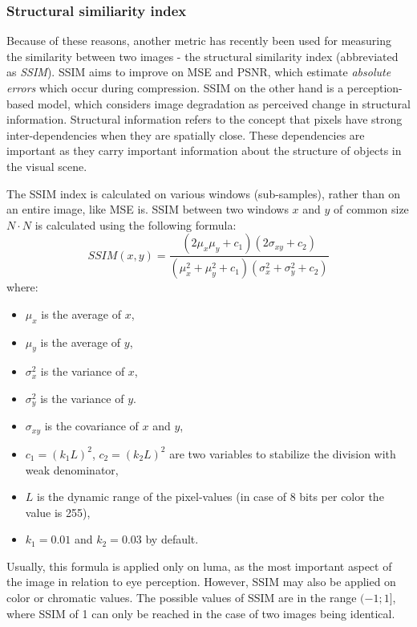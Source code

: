 \documentclass[thesis=M,english]{FITthesis}[2012/10/20]
\begin{document}
\subsubsection{Structural similiarity index}
Because of these reasons, another metric has recently been used for measuring the
similarity between two images - the structural similarity index (abbreviated as
\emph{SSIM}). SSIM aims to improve on MSE and PSNR, which estimate \emph{absolute
errors} which occur during compression. SSIM on the other hand is a perception-based
model, which considers image degradation as perceived change in structural information.
Structural information refers to the concept that pixels have strong inter-dependencies
when they are spatially close. These dependencies are important as they carry important
information about the structure of objects in the visual scene.

The SSIM index is calculated on various windows (sub-samples), rather than on an entire
image, like MSE is. SSIM between two windows $x$ and $y$ of common size $N \cdot N$ is
calculated using the following formula:
\begin{equation}
  SSIM(x, y) = \frac{(2\mu_{x}\mu_{y}+c_{1})(2\sigma_{xy} + c_{2})}{(\mu^{2}_{x} + \mu^{2}_{y} + c_{1})(\sigma^{2}_{x} + \sigma^{2}_{y} + c_2)}
\end{equation}
where:
\begin{itemize}
  \item $\mu_{x}$ is the average of $x$,
  \item $\mu_{y}$ is the average of $y$,
  \item $\sigma^{2}_{x}$ is the variance of $x$,
  \item $\sigma^{2}_{y}$ is the variance of $y$.
  \item $\sigma_{xy}$ is the covariance of $x$ and $y$,
  \item $c_1 = (k_1 L)^{2}$, $c_2 = (k_2 L)^{2}$ are two variables to stabilize
  the division with weak denominator,
  \item $L$ is the dynamic range of the pixel-values (in case of 8 bits per color the value is 255),
  \item $k_1 = 0.01$ and $k_2 = 0.03$ by default.
\end{itemize}\cite{ssim}

Usually, this formula is applied only on luma, as the most important aspect of the
image in relation to eye perception. However, SSIM may also be applied on color or
chromatic values. The possible values of SSIM are in the range $(-1; 1]$, where 
SSIM of 1 can only be reached in the case of two images being identical.
\end{document}
